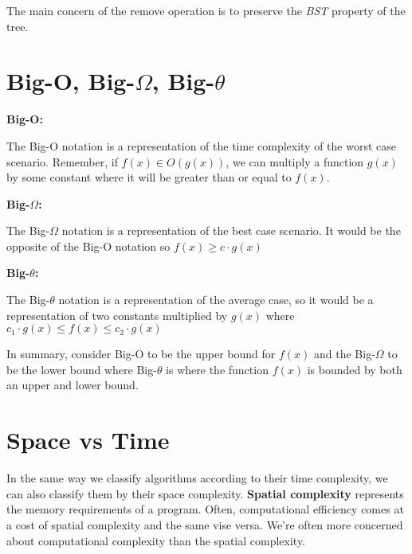 \documentclass[11pt,a4paper,english]{article}
\begin{document}
The main concern of the remove operation is to preserve the \textit{BST} property of the tree.

\section{Big-O, Big-$\Omega$, Big-$\theta$}

\textbf{Big-O:}

The Big-O notation is a representation of the time complexity of the worst case scenario.  Remember, if $f(x) \in O(g(x))$, we can multiply a function $g(x)$ by some constant where it will be greater than or equal to $f(x)$. 


\bigskip
\noindent \textbf{Big-$\Omega$:}

The Big-$\Omega$ notation is a representation of the best case scenario. It would be the opposite of the Big-O notation so $f(x) \geq c\cdot g(x)$

\bigskip

\noindent \textbf{Big-$\theta$:}

The Big-$\theta$ notation is a representation of the average case, so it would be a representation of two constants multiplied by $g(x)$ where $c_1\cdot g(x) \leq f(x) \leq c_2\cdot g(x)$

\bigskip
\noindent In summary, consider Big-O to be the upper bound for $f(x)$ and the Big-$\Omega$ to be the lower bound where Big-$\theta$ is where the function $f(x)$ is bounded by both an upper and lower bound.

\section{Space vs Time}

In the same way we classify algorithms according to their time complexity, we can also classify them by their space complexity. \textbf{Spatial complexity} represents the memory requirements of a program. Often, computational efficiency comes at a cost of spatial complexity and the same vise versa. We're often more concerned about computational complexity than the spatial complexity.
\end{document}
